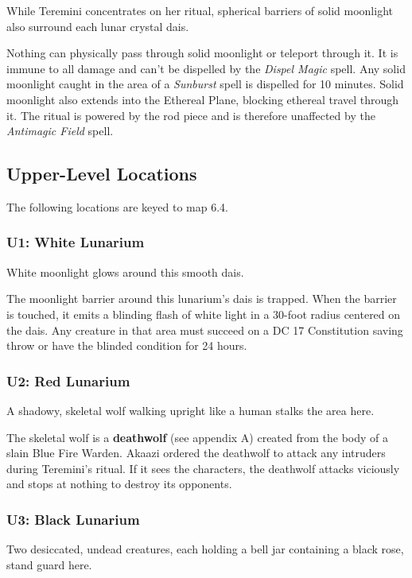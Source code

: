 \documentclass[10pt,a4paper,twoside,bg=print,twocolumn,openany,nodeprecatedcode]{dndbook}
\begin{document}
While Teremini concentrates on her ritual, spherical barriers of solid moonlight also surround each lunar crystal dais.

Nothing can physically pass through solid moonlight or teleport through it. It is immune to all damage and can't be dispelled by the \textit{Dispel Magic} spell. Any solid moonlight caught in the area of a \textit{Sunburst} spell is dispelled for 10 minutes. Solid moonlight also extends into the Ethereal Plane, blocking ethereal travel through it. The ritual is powered by the rod piece and is therefore unaffected by the \textit{Antimagic Field} spell.

\subsection{Upper-Level Locations}
The following locations are keyed to map 6.4.

\subsubsection{U1: White Lunarium}
\begin{DndReadAloud}{}
White moonlight glows around this smooth dais.

\end{DndReadAloud}

The moonlight barrier around this lunarium's dais is trapped. When the barrier is touched, it emits a blinding flash of white light in a 30-foot radius centered on the dais. Any creature in that area must succeed on a DC 17 Constitution saving throw or have the blinded condition for 24 hours.

\subsubsection{U2: Red Lunarium}
\begin{DndReadAloud}{}
A shadowy, skeletal wolf walking upright like a human stalks the area here.

\end{DndReadAloud}

The skeletal wolf is a \textbf{deathwolf} (see appendix A) created from the body of a slain Blue Fire Warden. Akaazi ordered the deathwolf to attack any intruders during Teremini's ritual. If it sees the characters, the deathwolf attacks viciously and stops at nothing to destroy its opponents.

\subsubsection{U3: Black Lunarium}
\begin{DndReadAloud}{}
Two desiccated, undead creatures, each holding a bell jar containing a black rose, stand guard here.

\end{DndReadAloud}
\end{document}

